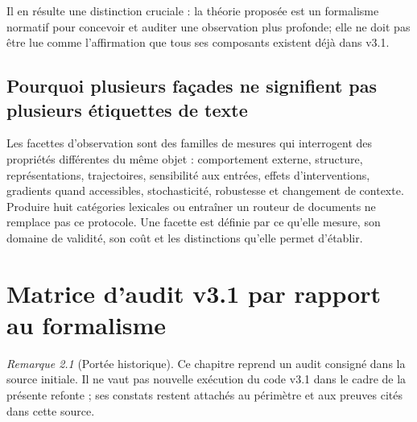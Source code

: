 \documentclass[11pt,oneside]{book}
\theoremstyle{definition}
\theoremstyle{remark}
\newtheorem{remarque}[theoreme]{Remarque}
\newcommand{\1}{\mathbf 1}
\begin{document}
Il en résulte une distinction cruciale : la théorie proposée est un formalisme normatif pour concevoir et auditer une observation plus profonde; elle ne doit pas être lue comme l'affirmation que tous ses composants existent déjà dans v3.1.

\section{Pourquoi plusieurs façades ne signifient pas plusieurs étiquettes de texte}
Les facettes d'observation sont des familles de mesures qui interrogent des propriétés différentes du même objet : comportement externe, structure, représentations, trajectoires, sensibilité aux entrées, effets d'interventions, gradients quand accessibles, stochasticité, robustesse et changement de contexte. Produire huit catégories lexicales ou entraîner un routeur de documents ne remplace pas ce protocole. Une facette est définie par ce qu'elle mesure, son domaine de validité, son coût et les distinctions qu'elle permet d'établir.

\chapter{Matrice d'audit v3.1 par rapport au formalisme}

\begin{remarque}[Portée historique]Ce chapitre reprend un audit consigné dans la source initiale. Il ne vaut pas nouvelle exécution du code v3.1 dans le cadre de la présente refonte ; ses constats restent attachés au périmètre et aux preuves cités dans cette source.\end{remarque}
\end{document}
